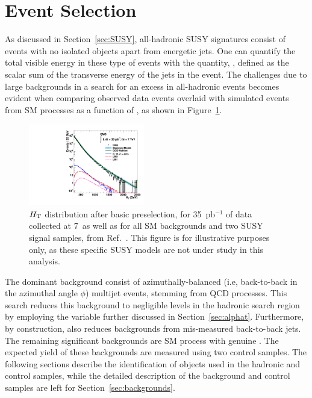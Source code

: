 \clearpage
\section{Event Selection\label{sec:eventSelection}}

As discussed in Section~\ref{sec:SUSY}, all-hadronic SUSY signatures consist of events with
no isolated objects apart from energetic jets. One can quantify the
total visible energy in these type of events with the quantity, \scalht, defined as 
the scalar sum of the transverse energy of the jets in the event. The challenges due to large
backgrounds in a search for an excess in all-hadronic events becomes evident 
when comparing observed data events overlaid with simulated events from 
SM processes as a function of \scalht, as shown in Figure~\ref{fig:HT-distribution}.

\begin{figure}[h!t]
  \begin{center}
      \includegraphics[width=0.45\textwidth,]{figures/data-mc/AllcombinedHT_all.pdf}
      \caption{\label{fig:ht} $\mbox{$H_\text{T}$}$ distribution after basic preselection,
           for 35~pb$^{-1}$ of data collected at {7}~\tev as well as for all 
           SM backgrounds and two SUSY signal samples, from Ref.~\cite{RA1Paper}. 
           This figure is for illustrative purposes only, as these specific SUSY 
           models are not under study in this analysis.}
    \label{fig:HT-distribution}
  \end{center}
\end{figure}

The dominant background consist of azimuthally-balanced (i.e, back-to-back in the azimuthal angle 
$\phi$) multijet events, stemming from QCD processes. This search reduces this background 
to negligible levels in the hadronic search region by employing the \alphat variable further 
discussed in Section~\ref{sec:alphat}. Furthermore, by construction, \alphat also reduces 
backgrounds from mis-measured back-to-back jets. The remaining significant backgrounds are 
SM process with genuine \met. The expected yield of these backgrounds are measured using two 
control samples. The following sections describe the identification of objects used in the 
hadronic and control samples, while the detailed description of the background and control 
samples are left for Section~\ref{sec:backgrounds}.

